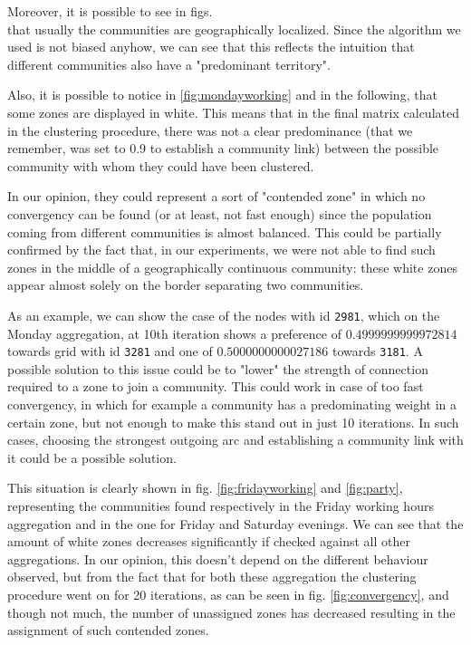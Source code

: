 \documentclass[12pt,a4paper]{article}
\begin{document}
Moreover, it is possible to see in figs. \\
that usually the communities are geographically localized. Since the algorithm we used is not biased anyhow, we can see
that this reflects the intuition that different communities also have a "predominant territory".

Also, it is possible to notice in \ref{fig:mondayworking} and in the following, that some zones are displayed in white. This means that in the final matrix calculated in the clustering procedure, there was not a clear predominance (that we remember, was set to 0.9 to establish a community link) between the possible community with whom they could have been clustered.

In our opinion, they could represent a sort of "contended zone" in which no convergency can be found (or at least, not fast enough) since the population coming from different communities is almost balanced. This could be partially confirmed by the fact that, in our experiments,
we were not able to find such zones in the middle of a geographically continuous community: these white zones appear almost solely on the border separating two communities.

As an example, we can show the case of the nodes with id \texttt{2981}, which on the Monday aggregation, at 10th iteration shows a preference of $0.4999999999972814$ towards grid with id \texttt{3281} and one of $0.5000000000027186$ towards \texttt{3181}.
A possible solution to this issue could be to "lower" the strength of connection required to a zone to join a community. This could work in case of too fast convergency, in which for example a community has a predominating weight in a certain zone, but not enough to make this stand out in just 10 iterations. In such cases, choosing the strongest outgoing arc and establishing a community link with it could be a possible solution. 

This situation is clearly shown in fig. \ref{fig:fridayworking} and \ref{fig:party}, representing the communities found respectively in the Friday working hours aggregation and in the one for Friday and Saturday evenings. We can see that the amount of white zones decreases significantly if checked against all other aggregations. In our opinion, this doesn't depend on the different behaviour observed, but from the fact that for both these aggregation the clustering procedure went on for 20 iterations, as can be seen in fig. \ref{fig:convergency}, and though not much, the number of unassigned zones has decreased resulting in the assignment of such contended zones.
\end{document}
